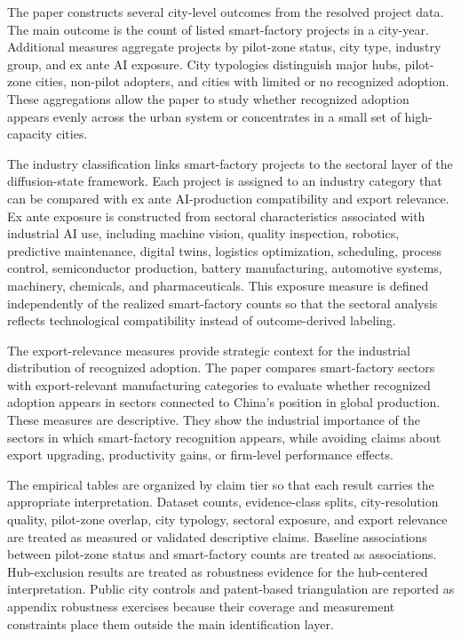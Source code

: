 \documentclass[12pt]{article}
\begin{document}
The paper constructs several city-level outcomes from the resolved project data. The main outcome is the count of listed smart-factory projects in a city-year. Additional measures aggregate projects by pilot-zone status, city type, industry group, and ex ante AI exposure. City typologies distinguish major hubs, pilot-zone cities, non-pilot adopters, and cities with limited or no recognized adoption. These aggregations allow the paper to study whether recognized adoption appears evenly across the urban system or concentrates in a small set of high-capacity cities.

The industry classification links smart-factory projects to the sectoral layer of the diffusion-state framework. Each project is assigned to an industry category that can be compared with ex ante AI-production compatibility and export relevance. Ex ante exposure is constructed from sectoral characteristics associated with industrial AI use, including machine vision, quality inspection, robotics, predictive maintenance, digital twins, logistics optimization, scheduling, process control, semiconductor production, battery manufacturing, automotive systems, machinery, chemicals, and pharmaceuticals. This exposure measure is defined independently of the realized smart-factory counts so that the sectoral analysis reflects technological compatibility instead of outcome-derived labeling.

The export-relevance measures provide strategic context for the industrial distribution of recognized adoption. The paper compares smart-factory sectors with export-relevant manufacturing categories to evaluate whether recognized adoption appears in sectors connected to China's position in global production. These measures are descriptive. They show the industrial importance of the sectors in which smart-factory recognition appears, while avoiding claims about export upgrading, productivity gains, or firm-level performance effects.

The empirical tables are organized by claim tier so that each result carries the appropriate interpretation. Dataset counts, evidence-class splits, city-resolution quality, pilot-zone overlap, city typology, sectoral exposure, and export relevance are treated as measured or validated descriptive claims. Baseline associations between pilot-zone status and smart-factory counts are treated as associations. Hub-exclusion results are treated as robustness evidence for the hub-centered interpretation. Public city controls and patent-based triangulation are reported as appendix robustness exercises because their coverage and measurement constraints place them outside the main identification layer.
\end{document}
